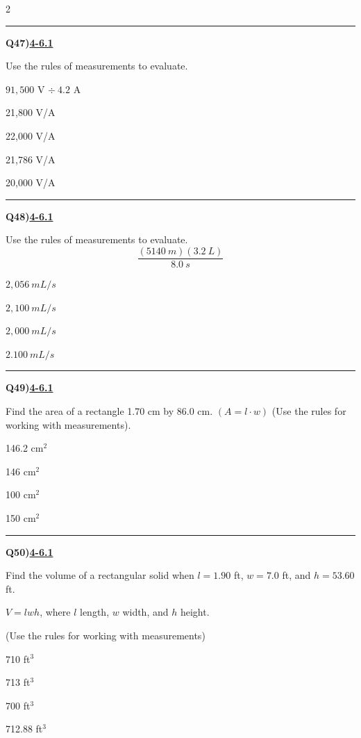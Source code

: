 \documentclass[11pt]{article}
\newenvironment{Qbox}[2]{%
  \par\medskip\noindent\begin{minipage}{\linewidth}%
  \hrule\medskip%
  \textbf{Q#1)}\hfill\textbf{\underline{#2}}\par\smallskip%
}{\par\end{minipage}\par\medskip}
\begin{document}
\begin{multicols}{2}
\begin{Qbox}{47}{4-6.1}
Use the rules of measurements to evaluate.\par\medskip $91{,}500$ V $\div\ 4.2$ A
\begin{choices}
  \item 21,800 V/A
  \item 22,000 V/A
  \item 21,786 V/A
  \item 20,000 V/A
\end{choices}
\end{Qbox}

\begin{Qbox}{48}{4-6.1}
Use the rules of measurements to evaluate.\[ \frac{(5140\ m)(3.2\ L)}{8.0\ s} \]
\begin{choices}
  \item $2{,}056\ mL/s$
  \item $2{,}100\ mL/s$
  \item $2{,}000\ mL/s$
  \item $2.100\ mL/s$
\end{choices}
\end{Qbox}

\begin{Qbox}{49}{4-6.1}
Find the area of a rectangle 1.70 cm by 86.0 cm. $(A=l\cdot w)$ (Use the rules for working with measurements).
\begin{choices}
  \item 146.2 cm$^2$
  \item 146 cm$^2$
  \item 100 cm$^2$
  \item 150 cm$^2$
\end{choices}
\end{Qbox}

\begin{Qbox}{50}{4-6.1}
Find the volume of a rectangular solid when $l=1.90$ ft, $w=7.0$ ft, and $h=53.60$ ft.\par\medskip $V=lwh$, where $l$ length, $w$ width, and $h$ height.\par\medskip (Use the rules for working with measurements)
\begin{choices}
  \item 710 ft$^3$
  \item 713 ft$^3$
  \item 700 ft$^3$
  \item 712.88 ft$^3$
\end{choices}
\end{Qbox}

\end{multicols}
\end{document}
